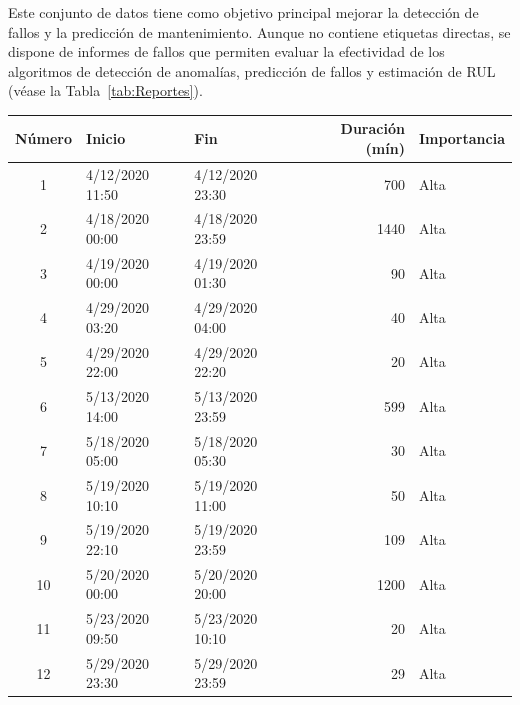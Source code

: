 \documentclass[12pt,letterpaper]{article}
\begin{document}
Este conjunto de datos tiene como objetivo principal mejorar la detección de fallos y la predicción de mantenimiento. 
Aunque no contiene etiquetas directas, se dispone de informes de fallos que permiten evaluar la efectividad de los algoritmos de detección de anomalías, predicción de fallos y estimación de RUL (véase la Tabla~\ref{tab:Reportes}).

\begin{table}[!ht]
    \centering
\begin{tabular}{|c|l|l|r|l|}
\hline
\textbf{Número} & \textbf{Inicio}       & \textbf{Fin}         & \textbf{Duración (mín)} & \textbf{Importancia} \\ \hline
1            & 4/12/2020 11:50          & 4/12/2020 23:30           & 700                & Alta              \\ \hline
2            & 4/18/2020 00:00          & 4/18/2020 23:59           & 1440               & Alta              \\ \hline
3            & 4/19/2020 00:00          & 4/19/2020 01:30           & 90                 & Alta              \\ \hline
4            & 4/29/2020 03:20          & 4/29/2020 04:00           & 40                 & Alta              \\ \hline
5            & 4/29/2020 22:00          & 4/29/2020 22:20           & 20                 & Alta              \\ \hline
6            & 5/13/2020 14:00          & 5/13/2020 23:59           & 599                & Alta              \\ \hline
7            & 5/18/2020 05:00          & 5/18/2020 05:30           & 30                 & Alta              \\ \hline
8            & 5/19/2020 10:10          & 5/19/2020 11:00           & 50                 & Alta              \\ \hline
9            & 5/19/2020 22:10          & 5/19/2020 23:59           & 109                & Alta              \\ \hline
10           & 5/20/2020 00:00          & 5/20/2020 20:00           & 1200               & Alta              \\ \hline
11           & 5/23/2020 09:50          & 5/23/2020 10:10           & 20                 & Alta              \\ \hline
12           & 5/29/2020 23:30          & 5/29/2020 23:59           & 29                 & Alta              \\ \hline

\end{tabular}
\end{table}
\end{document}
